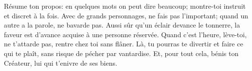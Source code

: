 Résume ton propos: en quelques mots on peut dire beaucoup;
	montre-toi instruit et discret à la fois.
Avec de grands personnages, ne fais pas l’important;
	quand un autre a la parole, ne bavarde pas.
Aussi sûr qu’un éclair devance le tonnerre,
	la faveur est d’avance acquise à une personne réservée.
Quand c’est l’heure, lève-toi,
	ne t’attarde pas, rentre chez toi sans flâner.
Là, tu pourras te divertir et faire ce qui te plaît,
	sans risque de pécher par vantardise.
Et, pour tout cela, bénis ton Créateur,
	lui qui t’enivre de ses biens.
